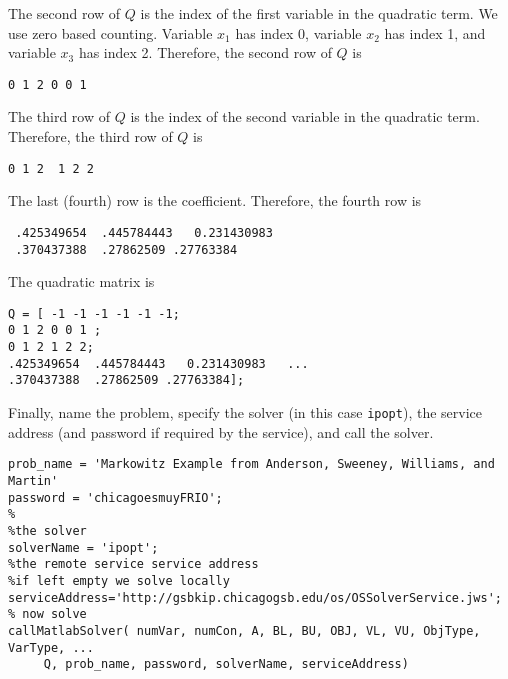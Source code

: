 \documentclass[11pt]{article}
\renewcommand{\_}{{\char"5F}}
\renewcommand{\{}{{\char"7B}}
\renewcommand{\}}{{\char"7D}}
\renewcommand{\^}{{\char"0D}}
\renewcommand{\'}{{\char"0D}}
\begin{document}
The second row of $Q$ is the index of the first variable in the quadratic term. We use zero based counting.  Variable $x_{1}$ has index 0, variable  $x_{2}$ has index 1, and variable $x_{3}$ has index 2.  Therefore, the second row of $Q$ is



\begin{verbatim}
0 1 2 0 0 1
\end{verbatim}



The third row of $Q$ is the index of the second variable in the quadratic term.   Therefore, the third row of $Q$ is



\begin{verbatim}
0 1 2  1 2 2
\end{verbatim}



The last (fourth) row is the coefficient. Therefore, the fourth row is





\begin{verbatim}
 .425349654  .445784443   0.231430983
 .370437388  .27862509 .27763384
\end{verbatim}


The quadratic matrix is



\begin{verbatim}
Q = [ -1 -1 -1 -1 -1 -1;
0 1 2 0 0 1 ;
0 1 2 1 2 2;
.425349654  .445784443   0.231430983   ...
.370437388  .27862509 .27763384];
\end{verbatim}


Finally, name the problem, specify the solver (in this case {\tt ipopt}), the service address (and password if required by the service), and call the solver.



\begin{verbatim}
prob_name = 'Markowitz Example from Anderson, Sweeney, Williams, and Martin'
password = 'chicagoesmuyFRIO';
%
%the solver
solverName = 'ipopt';
%the remote service service address
%if left empty we solve locally
serviceAddress='http://gsbkip.chicagogsb.edu/os/OSSolverService.jws';
% now solve
callMatlabSolver( numVar, numCon, A, BL, BU, OBJ, VL, VU, ObjType, VarType, ...
     Q, prob_name, password, solverName, serviceAddress)
\end{verbatim}
\end{document}
